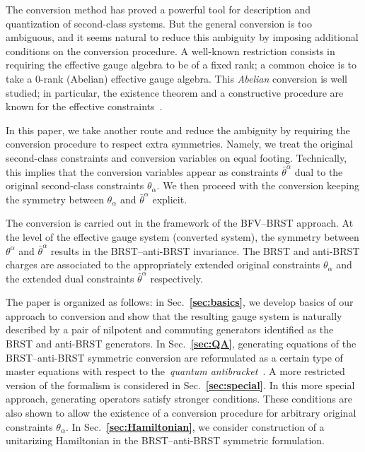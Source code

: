 \documentclass[a4paper,12pt]{amsart}
\numberwithin{equation}{section}
\newcommand{\bref}[1]{\textbf{\ref{#1}}}
\begin{document}
The conversion method has proved a powerful tool for description and
quantization of second-class systems.  But the general conversion is
too ambiguous, and it seems natural to reduce this ambiguity by
imposing additional conditions on the conversion procedure.  A
well-known restriction consists in requiring the effective gauge
algebra to be of a fixed rank; a common choice is to take a $0$-rank
(Abelian) effective gauge algebra.  This \textit{Abelian} conversion
is well studied; in particular, the existence theorem and a
constructive procedure are known for the effective
constraints~\cite{BT}.

In this paper, we take another route and reduce the ambiguity by
requiring the conversion procedure to respect extra symmetries.
Namely, we treat the original second-class constraints and conversion
variables on equal footing.  Technically, this implies that the
conversion variables appear as constraints $\bar\theta^\alpha$ dual to
the original second-class constraints $\theta_\alpha$.  We then
proceed with the conversion keeping the symmetry between
$\theta_\alpha$ and $\bar\theta^\alpha$ explicit.


The conversion is carried out in the framework of the BFV--BRST
approach.  At the level of the effective gauge system (converted
system), the symmetry between $\theta^\alpha$ and $\bar\theta^\alpha$
results in the BRST--anti-BRST invariance.  The BRST and anti-BRST charges
are associated to the appropriately
extended original constraints $\theta_\alpha$ and the extended dual
constraints $\bar\theta^\alpha$ respectively.


The paper is organized as follows: in Sec.~\bref{sec:basics}, we
develop basics of our approach to conversion and show that the
resulting gauge system is naturally described by a pair of nilpotent
and commuting generators identified as the BRST and anti-BRST
generators.  In Sec.~\bref{sec:QA}, generating equations of the
BRST--anti-BRST symmetric conversion are reformulated as a certain
type of master equations with respect to the~\textit{quantum
  antibracket}~\cite{BMQA}.  A more restricted version of the
formalism is considered in Sec.~\bref{sec:special}.  In this more
special approach, generating operators satisfy stronger conditions.
These conditions are also shown to allow the existence of a conversion
procedure for arbitrary original constraints $\theta_\alpha$.  In
Sec.~\bref{sec:Hamiltonian}, we consider construction of a unitarizing
Hamiltonian in the BRST--anti-BRST symmetric formulation.
\end{document}

